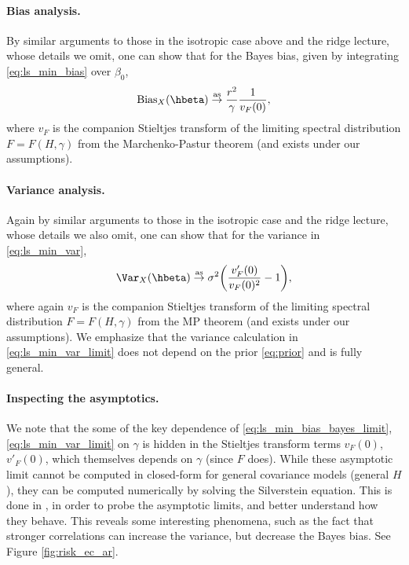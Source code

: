 \documentclass{article}
\begin{document}
\paragraph{Bias analysis.}

By similar arguments to those in the isotropic case above and the ridge lecture,
whose details we omit, one can show that for the Bayes bias, given by
integrating \eqref{eq:ls_min_bias} over $\beta_0$,
\begin{equation}
\label{eq:ls_min_bias_bayes_limit}
\Bias_X(\hbeta) \asto \frac{r^2}{\gamma} \frac{1}{v_F(0)},  
\end{equation}
where $v_F$ is the companion Stieltjes transform of the limiting spectral
distribution $F = F(H, \gamma)$ from the Marchenko-Pastur theorem (and
 exists under our
assumptions).   

\paragraph{Variance analysis.}

Again by similar arguments to those in the isotropic case and the ridge lecture,
whose details we also omit, one can show that for the variance in
\eqref{eq:ls_min_var},  
\begin{equation}
\label{eq:ls_min_var_limit}
\Var_X(\hbeta) \asto \sigma^2 \bigg(\frac{v'_F(0)}{v_F(0)^2} - 1 \bigg),
\end{equation}
where again $v_F$ is the companion Stieltjes transform of the limiting spectral 
distribution $F = F(H, \gamma)$ from the MP theorem (and
exists under our assumptions). We emphasize that the variance calculation in 
\eqref{eq:ls_min_var_limit} does not depend on the prior \eqref{eq:prior} and is
fully general.    

\paragraph{Inspecting the asymptotics.}

We note that the some of the key dependence of
\eqref{eq:ls_min_bias_bayes_limit}, \eqref{eq:ls_min_var_limit} on $\gamma$ is
hidden in the Stieltjes transform terms $v_F(0)$, $v'_F(0)$, which themselves
depends on $\gamma$ (since $F$ does). While these asymptotic limit cannot be
computed in closed-form for general covariance models (general $H$), they can be
computed numerically by solving the Silverstein equation. This is done in
\citet{hastie2022surprises}, in order to probe the asymptotic limits, and better
understand how they behave. This reveals some interesting phenomena, such as 
the fact that stronger correlations can increase the variance, but decrease the
Bayes bias. See Figure \ref{fig:risk_ec_ar}. 
\end{document}
